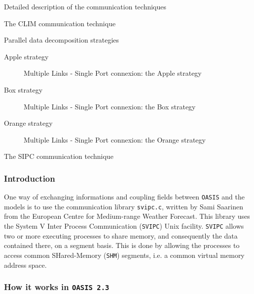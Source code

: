 \begin{section}{Detailed description of the communication techniques}
\begin{subsection}{The CLIM communication technique}
\begin{subsubsection}{Parallel data decomposition strategies}
\end{subsubsection}

\newpage
\begin{subsubsection}{Apple strategy}
\begin{figure}[hp]
\centerline{}
\caption{Multiple Links - Single Port connexion: the Apple strategy}
\label{applefig}
\end{figure}
\end{subsubsection}

\newpage
\begin{subsubsection}{Box strategy}
\begin{figure}[hp]
\centerline{}
\caption{Multiple Links - Single Port connexion: the Box strategy}
\label{boxfig}
\end{figure}
\end{subsubsection}

\newpage
\begin{subsubsection}{Orange strategy}
\begin{figure}[hp]
\centerline{}
\caption{Multiple Links - Single Port connexion: the Orange strategy}
\label{orangefig}
\end{figure}
\end{subsubsection}
\end{subsection}

\begin{subsection}{The SIPC communication technique}
\label{subsec_sipccomm}
\subsubsection{Introduction}
One way of exchanging informations and coupling fields between 
{\tt OASIS} and the
models is to use the communication library {\tt svipc.c}, written by Sami Saarinen
from the European Centre for Medium-range Weather Forecast. This library uses 
the System V Inter Process Communication ({\tt SVIPC}) Unix facility. {\tt SVIPC} allows
two or more executing processes to share memory, and consequently the data 
contained there, on a segment basis. This is done by allowing the processes to
access common
SHared-Memory ({\tt SHM}) segments, i.e. a common virtual memory address space. 

\subsubsection{How it works in {\tt OASIS 2.3}}


\end{subsection}
\end{section}
